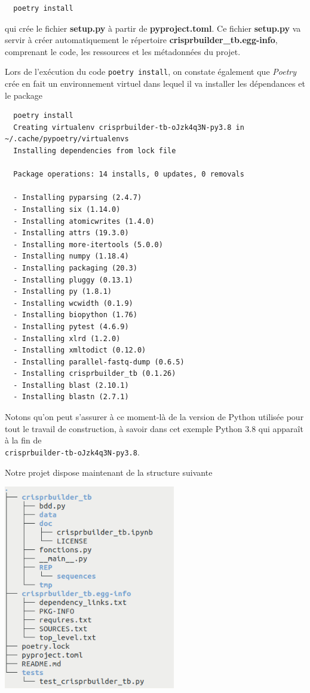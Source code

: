 \documentclass[twoside,a4paper,11pt,frenchb,openany]{report}
\begin{document}
\begin{verbatim}
  poetry install
\end{verbatim}

qui crée le fichier \textbf{setup.py} à partir de \textbf{pyproject.toml}. Ce fichier \textbf{setup.py} va servir à créer automatiquement le répertoire \textbf{crisprbuilder\_tb.egg-info}, comprenant le code, les ressources et les métadonnées du projet.

Lors de l'exécution du code \texttt{poetry install}, on constate également que \textit{Poetry} crée en fait un environnement virtuel dans lequel il va installer les dépendances et le package

\begin{verbatim}  poetry install
  Creating virtualenv crisprbuilder-tb-oJzk4q3N-py3.8 in ~/.cache/pypoetry/virtualenvs
  Installing dependencies from lock file

  Package operations: 14 installs, 0 updates, 0 removals

  - Installing pyparsing (2.4.7)
  - Installing six (1.14.0)
  - Installing atomicwrites (1.4.0)
  - Installing attrs (19.3.0)
  - Installing more-itertools (5.0.0)
  - Installing numpy (1.18.4)
  - Installing packaging (20.3)
  - Installing pluggy (0.13.1)
  - Installing py (1.8.1)
  - Installing wcwidth (0.1.9)
  - Installing biopython (1.76)
  - Installing pytest (4.6.9)
  - Installing xlrd (1.2.0)
  - Installing xmltodict (0.12.0)
  - Installing parallel-fastq-dump (0.6.5)
  - Installing crisprbuilder_tb (0.1.26)
  - Installing blast (2.10.1)
  - Installing blastn (2.7.1)
\end{verbatim}

Notons qu'on peut s'assurer à ce moment-là de la version de Python utilisée pour tout le travail de construction, à savoir dans cet exemple Python 3.8 qui apparaît à la fin de \\\texttt{crisprbuilder-tb-oJzk4q3N-py3.8}.

Notre projet dispose maintenant de la structure suivante

\includegraphics[width=7.5cm]{crispr_etape3.png}
\end{document}
